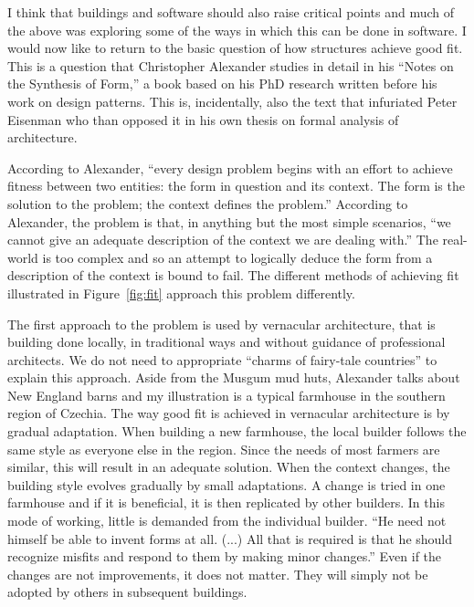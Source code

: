 I think that buildings and software should also raise critical points and much of the above was
exploring some of the ways in which this can be done in software. I would now like to return
to the basic question of how structures achieve good fit. This is a question that Christopher
Alexander studies in detail in his ``Notes on the Synthesis of Form,'' a book based
on his PhD research written before his work on design patterns. This is, incidentally,
also the text that infuriated Peter Eisenman who than opposed it in his own thesis on formal
analysis of architecture.

According to Alexander, ``every design problem begins with an effort to achieve fitness
between two entities: the form in question and its context. The form is the solution to
the problem; the context defines the problem.'' According to Alexander,
the problem is that, in anything but the most simple scenarios, ``we cannot give an adequate
description of the context we are dealing with.'' The real-world is too
complex and so an attempt to logically deduce the form from a description of the context is bound
to fail. The different methods of achieving fit illustrated in Figure~\ref{fig:fit}
approach this problem differently.

The first approach to the problem is used by vernacular architecture, that is building done
locally, in traditional ways and without guidance of professional architects. We do not need
to appropriate ``charms of fairy-tale countries'' to explain this approach. Aside from
the Musgum mud huts, Alexander talks about New England barns and my illustration is a typical
farmhouse in the southern region of Czechia. The way good fit is achieved in vernacular
architecture is by gradual adaptation. When building a new farmhouse, the local builder follows
the same style as everyone else in the region. Since the needs of most farmers are similar,
this will result in an adequate solution. When the context changes, the building style evolves
gradually by small adaptations. A change is tried in one farmhouse and if it is beneficial, it is
then replicated by other builders. In this mode of working, little is demanded from the individual
builder. ``He need not himself be able to invent forms at all. (...) All that is required is that
he should recognize misfits and respond to them by making minor changes.''
Even if the changes are not improvements, it does not matter. They will simply not be adopted
by others in subsequent buildings.

